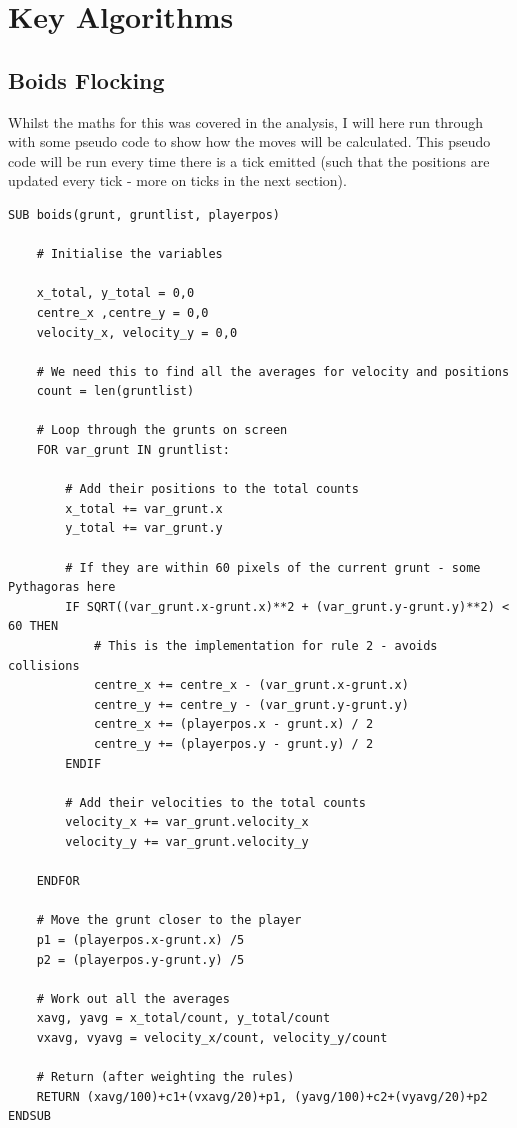 \section{Key Algorithms}
\subsection{Boids Flocking}
Whilst the maths for this was covered in the  analysis, I will here run through with some pseudo code to show how the moves will be calculated. This pseudo code will be run every time there is a tick emitted (such that the positions are updated every tick - more on ticks in the next section).

\begin{lstlisting}
SUB boids(grunt, gruntlist, playerpos)
    
    # Initialise the variables
    
    x_total, y_total = 0,0
    centre_x ,centre_y = 0,0
    velocity_x, velocity_y = 0,0
    
    # We need this to find all the averages for velocity and positions
    count = len(gruntlist)
    
    # Loop through the grunts on screen
    FOR var_grunt IN gruntlist:

        # Add their positions to the total counts
        x_total += var_grunt.x
        y_total += var_grunt.y
        
        # If they are within 60 pixels of the current grunt - some Pythagoras here
        IF SQRT((var_grunt.x-grunt.x)**2 + (var_grunt.y-grunt.y)**2) < 60 THEN
            # This is the implementation for rule 2 - avoids collisions
            centre_x += centre_x - (var_grunt.x-grunt.x)
            centre_y += centre_y - (var_grunt.y-grunt.y)
            centre_x += (playerpos.x - grunt.x) / 2
            centre_y += (playerpos.y - grunt.y) / 2
        ENDIF
        
        # Add their velocities to the total counts
        velocity_x += var_grunt.velocity_x
        velocity_y += var_grunt.velocity_y
    
    ENDFOR
    
    # Move the grunt closer to the player
    p1 = (playerpos.x-grunt.x) /5
    p2 = (playerpos.y-grunt.y) /5

    # Work out all the averages
    xavg, yavg = x_total/count, y_total/count
    vxavg, vyavg = velocity_x/count, velocity_y/count
    
    # Return (after weighting the rules)
    RETURN (xavg/100)+c1+(vxavg/20)+p1, (yavg/100)+c2+(vyavg/20)+p2
ENDSUB
\end{lstlisting}

